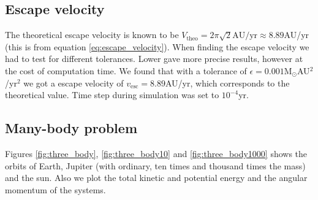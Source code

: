 \documentclass[reprint, english,notitlepage,nofootinbib]{revtex4-1}  %
\begin{document}
\subsection{Escape velocity}

The theoretical escape velocity is known to be $V_{\text{theo}} = 2\pi\sqrt{2}\text{AU/yr} \approx 8.89$AU/yr (this is from equation \eqref{eq:escape_velocity}). When finding the escape velocity we had to test for different tolerances. Lower gave more precise results, however at the cost of computation time. We found that with a tolerance of $\epsilon = 0.001$M$_\odot$AU$^2$/yr$^2$ we got a escape velocity of $v_{\text{esc}} = 8.89$AU/yr, which corresponds to the theoretical value. Time step during simulation was set to $10^{-4}$yr.


\subsection{Many-body problem}

Figures \ref{fig:three_body}, \ref{fig:three_body10} and \ref{fig:three_body1000} shows the orbits of Earth, Jupiter (with ordinary, ten times and thousand times the mass) and the sun. Also we plot the total kinetic and potential energy and the angular momentum of the systems.
\end{document}
